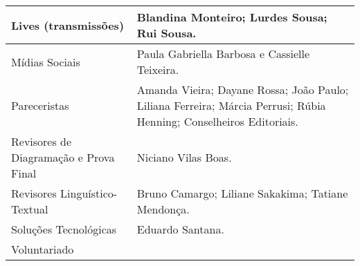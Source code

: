 \documentclass{gescons}
\begin{document}
\begin{longtable}[]{@{}
  >{\raggedright\arraybackslash}p{}
  >{\raggedright\arraybackslash}p{}@{}}
\hline
\begin{minipage}[b]{\linewidth}\raggedright
Lives (transmissões)
\end{minipage} & \begin{minipage}[b]{\linewidth}\raggedright
Blandina Monteiro; Lurdes Sousa; Rui Sousa.
\end{minipage} \\
\hline
\begin{minipage}[b]{\linewidth}\raggedright
Mídias Sociais
\end{minipage} & \begin{minipage}[b]{\linewidth}\raggedright
Paula Gabriella Barbosa e Cassielle Teixeira.
\end{minipage} \\
\hline
\begin{minipage}[b]{\linewidth}\raggedright
Pareceristas
\end{minipage} & \begin{minipage}[b]{\linewidth}\raggedright\addlinespace[4pt]
Amanda Vieira; Dayane Rossa; João Paulo; Liliana Ferreira; Márcia Perrusi; Rúbia Henning; Conselheiros Editoriais.
\end{minipage} \\
\hline
\begin{minipage}[b]{\linewidth}\raggedright\addlinespace[4pt]
Revisores de Diagramação e Prova Final
\end{minipage} & \begin{minipage}[b]{\linewidth}\raggedright
Niciano Vilas Boas.
\end{minipage} \\
\hline
\begin{minipage}[b]{\linewidth}\raggedright
Revisores Linguístico-Textual
\end{minipage} & \begin{minipage}[b]{\linewidth}\raggedright
Bruno Camargo; Liliane Sakakima; Tatiane Mendonça.
\end{minipage} \\
\hline
\begin{minipage}[b]{\linewidth}\raggedright
Soluções Tecnológicas
\end{minipage} & \begin{minipage}[b]{\linewidth}\raggedright
Eduardo Santana.
\end{minipage} \\
\hline
\begin{minipage}[b]{\linewidth}\raggedright
Voluntariado
\end{minipage} & \begin{minipage}[b]{\linewidth}\raggedright

\end{minipage}
\end{longtable}
\end{document}
